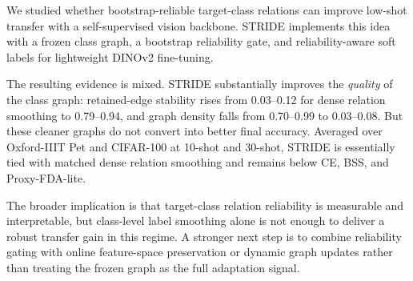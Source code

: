 \documentclass{article}
\newcommand{\method}{STRIDE\xspace}
\begin{document}
We studied whether bootstrap-reliable target-class relations can improve low-shot transfer with a self-supervised vision backbone. \method implements this idea with a frozen class graph, a bootstrap reliability gate, and reliability-aware soft labels for lightweight DINOv2 fine-tuning.

The resulting evidence is mixed. \method substantially improves the \emph{quality} of the class graph: retained-edge stability rises from 0.03--0.12 for dense relation smoothing to 0.79--0.94, and graph density falls from 0.70--0.99 to 0.03--0.08. But these cleaner graphs do not convert into better final accuracy. Averaged over Oxford-IIIT Pet and CIFAR-100 at 10-shot and 30-shot, \method is essentially tied with matched dense relation smoothing and remains below CE, BSS, and Proxy-FDA-lite.

The broader implication is that target-class relation reliability is measurable and interpretable, but class-level label smoothing alone is not enough to deliver a robust transfer gain in this regime. A stronger next step is to combine reliability gating with online feature-space preservation or dynamic graph updates rather than treating the frozen graph as the full adaptation signal.



\end{document}
